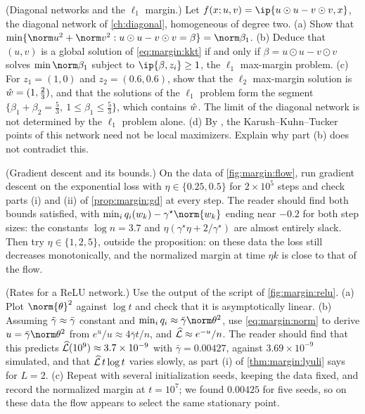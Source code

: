 \begin{refsection}
\begin{exercises}
\item \variation\hard (Diagonal networks and the $\ell_1$ margin.) Let $f(x;u,v)=\ip{u\odot u-v\odot v,x}$, the diagonal network of \cref{ch:diagonal}, homogeneous of degree two. (a) Show that $\min\{\norm u^2+\norm v^2:u\odot u-v\odot v=\beta\}=\norm\beta_1$. (b) Deduce that $(u,v)$ is a global solution of \eqref{eq:margin:kkt} if and only if $\beta=u\odot u-v\odot v$ solves $\min\norm\beta_1$ subject to $\ip{\beta,z_i}\ge1$, the $\ell_1$ max-margin problem. (c) For $z_1=(1,0)$ and $z_2=(0.6,0.6)$, show that the $\ell_2$ max-margin solution is $\hat w=(1,\frac23)$, and that the solutions of the $\ell_1$ problem form the segment $\{\beta_1+\beta_2=\frac53,\ 1\le\beta_1\le\frac53\}$, which contains $\hat w$. The limit of the diagonal network is not determined by the $\ell_1$ problem alone. (d) By \textcite{VardiShamirSrebro2022}, the Karush--Kuhn--Tucker points of this network need not be local maximizers. Explain why part (b) does not contradict this. \label{ex:margin:diagonal}

\item \simulation (Gradient descent and its bounds.) On the data of \cref{fig:margin:flow}, run gradient descent on the exponential loss with $\eta\in\{0.25,0.5\}$ for $2\times10^5$ steps and check parts (i) and (ii) of \cref{prop:margin:gd} at every step. The reader should find both bounds satisfied, with $\min_iq_i(w_k)-\gamma^\star\norm{w_k}$ ending near $-0.2$ for both step sizes: the constants $\log n=3.7$ and $\eta(\gamma^\star\eta+2/\gamma^\star)$ are almost entirely slack. Then try $\eta\in\{1,2,5\}$, outside the proposition: on these data the loss still decreases monotonically, and the normalized margin at time $\eta k$ is close to that of the flow. \label{ex:margin:gdsim}

\item \simulation (Rates for a ReLU network.) Use the output of the script of \cref{fig:margin:relu}. (a) Plot $\norm{\theta}^2$ against $\log t$ and check that it is asymptotically linear. (b) Assuming $\tilde\gamma\approx\bar\gamma$ constant and $\min_iq_i\approx\bar\gamma\norm\theta^2$, use \eqref{eq:margin:norm} to derive $u=\bar\gamma\norm\theta^2$ from $e^u/u\approx4\bar\gamma t/n$, and $\widehat{\mathcal{L}}\approx e^{-u}/n$. The reader should find that this predicts $\widehat{\mathcal{L}}(10^9)\approx3.7\times10^{-9}$ with $\bar\gamma=0.00427$, against $3.69\times10^{-9}$ simulated, and that $\widehat{\mathcal{L}}\,t\log t$ varies slowly, as part (i) of \cref{thm:margin:lyuli} says for $L=2$. (c) Repeat with several initialization seeds, keeping the data fixed, and record the normalized margin at $t=10^7$; we found $0.00425$ for five seeds, so on these data the flow appears to select the same stationary point. \label{ex:margin:relurate}


\end{exercises}
\end{refsection}
